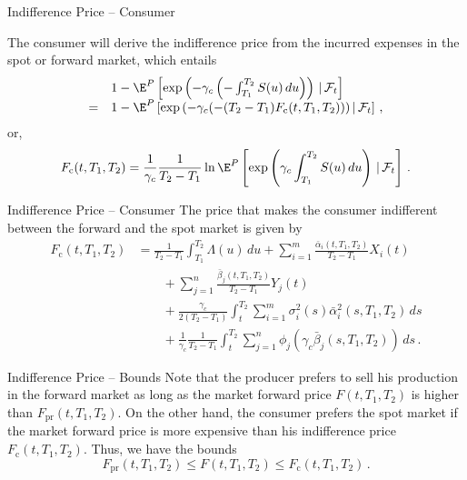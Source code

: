 {Indifference Price -- Consumer}

The consumer will derive the indifference price from the incurred expenses
in the spot or forward market, which entails
$$
\begin{array}{ll}
&1-\E^P\left[\exp\left(-\gamma_c\left(-\int_{T_1}^{T_2}S(u)\,du\right)\right)
\,|\,\mathcal{F}_t\right]\\
= &1-\E^P\left[\exp\left(-\gamma_c(-(T_2-T_1)F_{\text{c}}(t,T_1,T_2)\right))\,|\,
\mathcal{F}_t\right]\,,
\end{array}
$$
or,
\begin{equation}
F_{\text{c}}(t,T_1,T_2)=\frac1{\gamma_c}\frac1{T_2-T_1}\ln\E^P\left[
\exp\left(\gamma_c\int_{T_1}^{T_2}S(u)\,du\right)\,|\,\mathcal{F}_t\right]\,.
\end{equation}



{Indifference Price -- Consumer}
The price that makes the consumer indifferent between the forward
and the spot market is given by
\begin{align*}
F_{\text{c}}(t,T_1,T_2)&=\frac1{T_2-T_1}\int_{T_1}^{T_2}\Lambda(u)\,du
+\sum_{i=1}^m\frac{\bar{\alpha}_i(t,T_1,T_2)}{T_2-T_1}X_i(t)\\
&\qquad+\sum_{j=1}^n\frac{\bar{\beta}_j(t,T_1,T_2)}{T_2-T_1}Y_j(t) \\
&\qquad+\frac{\gamma_c}{2(T_2-T_1)}\int_t^{T_2}
\sum_{i=1}^m\sigma_i^2(s)\bar{\alpha}_i^2(s,T_1,T_2)\,ds \\
&\qquad+\frac1{\gamma_c}\frac1{T_2-T_1}\int_t^{T_2}\sum_{j=1}^n
\phi_j\left(\gamma_c\bar{\beta}_j(s,T_1,T_2)\right)\,ds\,.
\end{align*}



{Indifference Price -- Bounds}
Note that the producer prefers to sell his production in the forward
market as long as the market forward price $F(t,T_1,T_2)$ is higher
than $F_{\text{pr}}(t,T_1,T_2)$. On the other hand, the consumer
prefers the spot market if the market forward price is more
expensive than his indifference price $F_{\text{c}}(t,T_1,T_2)$.
Thus, we have the bounds
\begin{equation}\label{bounds for forward}
F_{\text{pr}}(t,T_1,T_2)\leq F(t,T_1,T_2)\leq
F_{\text{c}}(t,T_1,T_2)\,.
\end{equation}



